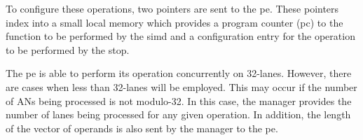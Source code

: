 To configure these operations, two pointers are sent to the \ac{pe}. These pointers index into a small local memory which provides a program counter (\ac{pc}) to the function to be performed by the \ac{simd} and a configuration entry for the operation to be performed by the \ac{stop}.

The \ac{pe} is able to perform its operation concurrently on 32-lanes. However, there are cases when less than 32-lanes will be employed. This may occur if the number of ANs being processed is not modulo-32. In this case, the manager provides the number of lanes being processed for any given operation. In addition, the length of the vector of operands is also sent by the manager to the \ac{pe}.


